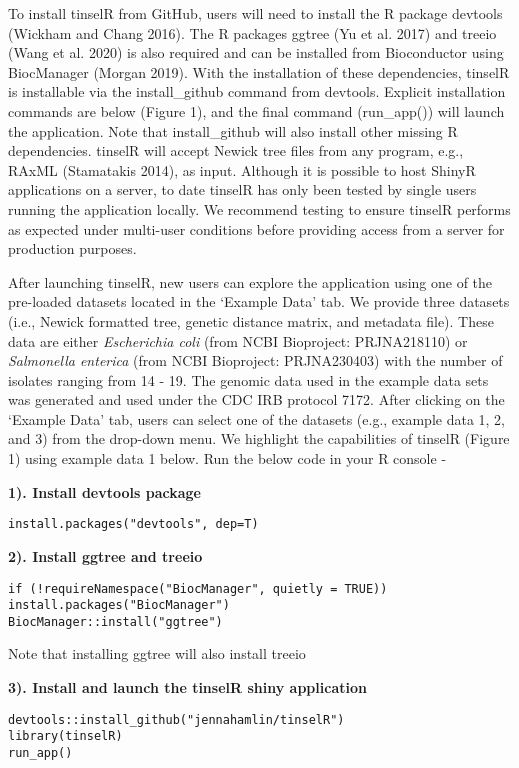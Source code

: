 \documentclass[
]{article}
\begin{document}
To install tinselR from GitHub, users will need to install the R package
devtools (Wickham and Chang 2016). The R packages ggtree (Yu et al.
2017) and treeio (Wang et al. 2020) is also required and can be
installed from Bioconductor using BiocManager (Morgan 2019). With the
installation of these dependencies, tinselR is installable via the
install\_github command from devtools. Explicit installation commands
are below (Figure 1), and the final command (run\_app()) will launch the
application. Note that install\_github will also install other missing R
dependencies. tinselR will accept Newick tree files from any program,
e.g., RAxML (Stamatakis 2014), as input. Although it is possible to host
ShinyR applications on a server, to date tinselR has only been tested by
single users running the application locally. We recommend testing to
ensure tinselR performs as expected under multi-user conditions before
providing access from a server for production purposes.

After launching tinselR, new users can explore the application using one
of the pre-loaded datasets located in the `Example Data' tab. We provide
three datasets (i.e., Newick formatted tree, genetic distance matrix,
and metadata file). These data are either \emph{Escherichia coli} (from
NCBI Bioproject: PRJNA218110) or \emph{Salmonella enterica} (from NCBI
Bioproject: PRJNA230403) with the number of isolates ranging from 14 -
19. The genomic data used in the example data sets was generated and
used under the CDC IRB protocol 7172. After clicking on the `Example
Data' tab, users can select one of the datasets (e.g., example data 1,
2, and 3) from the drop-down menu. We highlight the capabilities of
tinselR (Figure 1) using example data 1 below. Run the below code in
your R console -

\textbf{1). Install devtools package}

\texttt{install.packages("devtools",\ dep=T)}

\textbf{2). Install ggtree and treeio}

\begin{verbatim}
if (!requireNamespace("BiocManager", quietly = TRUE))
install.packages("BiocManager")
BiocManager::install("ggtree")
\end{verbatim}

Note that installing ggtree will also install treeio

\textbf{3). Install and launch the tinselR shiny application}

\begin{verbatim}
devtools::install_github("jennahamlin/tinselR")
library(tinselR)
run_app()
\end{verbatim}
\end{document}
